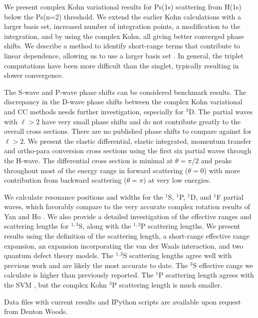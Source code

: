 \documentclass[preprint,showpacs,preprintnumbers,amsmath,amssymb,longbibliography,pra,aps]{revtex4-1}
\newcommand{\todoi}{\todo[inline]}
\begin{document}
We present complex Kohn variational results for Ps(1s) scattering from H(1s) below the Ps(n=2) threshold. We extend the earlier Kohn calculations \cite{VanReeth2003,VanReeth2004} with a larger basis set, increased number of integration points, a modification to the integration, and by using the complex Kohn, all giving better converged phase shifts. We describe a method to identify short-range terms that contribute to linear dependence, allowing us to use a larger basis set \cite{Todd2007}. In general, the triplet computations have been more difficult than the singlet, typically resulting in slower convergence.

The S-wave and P-wave phase shifts can be considered benchmark results. The discrepancy in the D-wave phase shifts between the complex Kohn variational and CC methods needs further investigation, especially for $^3$D. The partial waves with $\ell > 2$ have very small phase shifts and do not contribute greatly to the overall cross sections. There are no published phase shifts to compare against for $\ell > 2$. We present the elastic differential, elastic integrated, momentum transfer and ortho-para conversion cross sections using the first six partial waves through the H-wave. The differential cross section is minimal at $\theta = \pi/2$ and peaks throughout most of the energy range in forward scattering ($\theta = 0$) with more contribution from backward scattering ($\theta = \pi$) at very low energies.

We calculate resonance positions and widths for the $^1$S, $^1$P, $^1$D, and $^1$F partial waves, which favorably compare to the very accurate complex rotation results of Yan and Ho \cite{Yan1999,Yan1998a,Ho1998,Ho2000}. We also provide a detailed investigation of the effective ranges and scattering lengths for $^{1,3}$S, along with the $^{1,3}$P scattering lengths. We present results using the definition of the scattering length, a short-range effective range expansion, an expansion incorporating the van der Waals interaction, and two quantum defect theory models. The $^{1,3}$S scattering lengths agree well with previous work and are likely the most accurate to date. The $^3$S effective range we calculate is higher than previously reported. The $^1$P scattering length agrees with the SVM \cite{Ivanov2002}, but the complex Kohn $^3$P scattering length is much smaller.

Data files with current results and IPython scripts are available upon request from Denton Woods.


\end{document}
